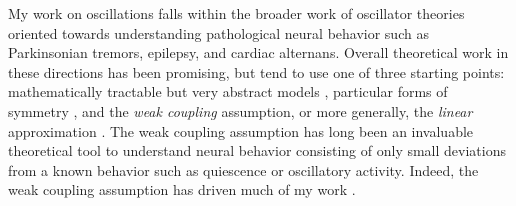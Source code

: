 \documentclass[a4paper,11pt]{article}
\begin{document}
% 
% 
% 
%


My work on oscillations falls within the broader work of oscillator theories oriented towards understanding pathological neural behavior such as Parkinsonian tremors, epilepsy, and cardiac alternans. Overall theoretical work in these directions has been promising, but tend to use one of three starting points: mathematically tractable but very abstract models \cite{ott2008low}, particular forms of symmetry \cite{golubitsky1986hopf}, and the \textit{weak coupling} assumption, or more generally, the \textit{linear} approximation \cite{ermentrout2002modeling}. The weak coupling assumption has long been an invaluable theoretical tool to understand neural behavior consisting of only small deviations from a known behavior such as quiescence or oscillatory activity. Indeed, the weak coupling assumption has driven much of my work \cite{park2016weakly,park2018multiple,park2018scalar}. 
\end{document}
